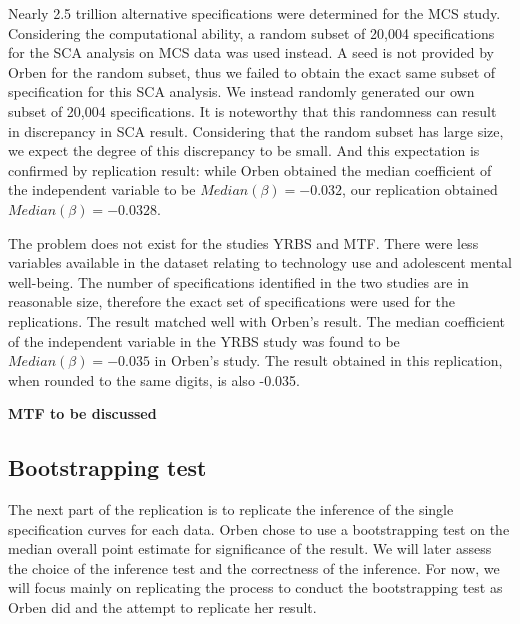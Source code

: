 \documentclass[12pt,twoside]{reedthesis}
\begin{document}
  \par 
  
  Nearly 2.5 trillion alternative specifications were determined for the
  MCS study. Considering the computational ability, a random subset of
  20,004 specifications for the SCA analysis on MCS data was used instead.
  A seed is not provided by Orben for the random subset, thus we failed to
  obtain the exact same subset of specification for this SCA analysis. We
  instead randomly generated our own subset of 20,004 specifications. It
  is noteworthy that this randomness can result in discrepancy in SCA
  result. Considering that the random subset has large size, we expect the
  degree of this discrepancy to be small. And this expectation is
  confirmed by replication result: while Orben obtained the median
  coefficient of the independent variable to be
  \(Median(\beta) = -0.032\), our replication obtained
  \(Median(\beta) = -0.0328\).
  
  \par 
  
  The problem does not exist for the studies YRBS and MTF. There were less
  variables available in the dataset relating to technology use and
  adolescent mental well-being. The number of specifications identified in
  the two studies are in reasonable size, therefore the exact set of
  specifications were used for the replications. The result matched well
  with Orben's result. The median coefficient of the independent variable
  in the YRBS study was found to be \(Median(\beta) = -0.035\) in Orben's
  study. The result obtained in this replication, when rounded to the same
  digits, is also -0.035.
  
  \par 
  
  \textbf{MTF to be discussed}
  
  \subsection{Bootstrapping test}\label{bootstrapping-test}
  
  \par 
  
  The next part of the replication is to replicate the inference of the
  single specification curves for each data. Orben chose to use a
  bootstrapping test on the median overall point estimate for significance
  of the result. We will later assess the choice of the inference test and
  the correctness of the inference. For now, we will focus mainly on
  replicating the process to conduct the bootstrapping test as Orben did
  and the attempt to replicate her result.
  
\end{document}
